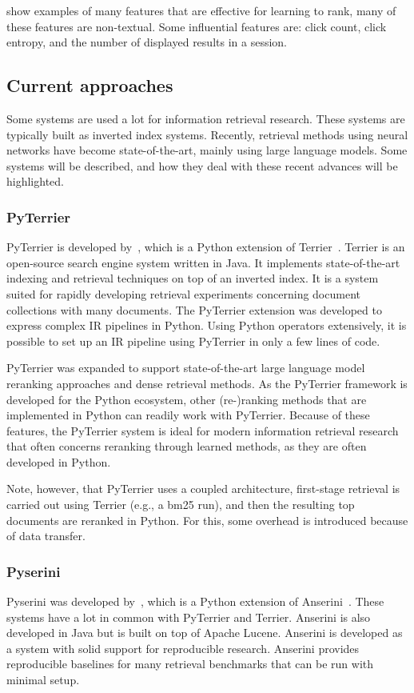  show examples of many features that are effective for learning to rank, many of these features are non-textual. Some influential features are: click count, click entropy, and the number of displayed results in a session.  

\subsection{Current approaches}
Some systems are used a lot for information retrieval research. These systems are typically built as inverted index systems. Recently, retrieval methods using neural networks have become state-of-the-art, mainly using large language models. Some systems will be described, and how they deal with these recent advances will be highlighted.  

\subsubsection{PyTerrier}
PyTerrier is developed by~\citet{pyterrier}, which is a Python extension of Terrier~\citep{terrier}. Terrier is an open-source search engine system written in Java. It implements state-of-the-art indexing and retrieval techniques on top of an inverted index. It is a system suited for rapidly developing retrieval experiments concerning document collections with many documents. 
The PyTerrier extension was developed to express complex IR pipelines in Python. Using Python operators extensively, it is possible to set up an IR pipeline using PyTerrier in only a few lines of code. 

PyTerrier was expanded to support state-of-the-art large language model reranking approaches and dense retrieval methods. As the PyTerrier framework is developed for the Python ecosystem, other (re-)ranking methods that are implemented in Python can readily work with PyTerrier. Because of these features, the PyTerrier system is ideal for modern information retrieval research that often concerns reranking through learned methods, as they are often developed in Python.

Note, however, that PyTerrier uses a coupled architecture, first-stage retrieval is carried out using Terrier (e.g., a bm25 run), and then the resulting top documents are reranked in Python. For this, some overhead is introduced because of data transfer. 

\subsubsection{Pyserini}
Pyserini was developed by~\citet{pyserini}, which is a Python extension of Anserini~\citep{anserini}. These systems have a lot in common with PyTerrier and Terrier. Anserini is also developed in Java but is built on top of Apache Lucene. Anserini is developed as a system with solid support for reproducible research. Anserini provides reproducible baselines for many retrieval benchmarks that can be run with minimal setup. 

